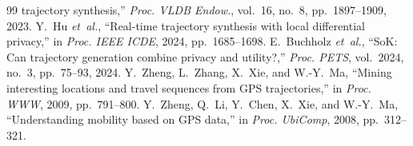 \documentclass[10pt,journal,compsoc]{IEEEtran}
\begin{document}
\begin{thebibliography}{99}
trajectory synthesis,'' \emph{Proc. VLDB Endow.}, vol.~16, no.~8, pp.~1897--1909,
2023.
 Y.~Hu \emph{et~al.}, ``Real-time trajectory synthesis with local
differential privacy,'' in \emph{Proc. IEEE ICDE}, 2024, pp.~1685--1698.
 E.~Buchholz \emph{et~al.}, ``SoK: Can trajectory generation
combine privacy and utility?,'' \emph{Proc. PETS}, vol.~2024, no.~3, pp.~75--93,
2024.
 Y.~Zheng, L.~Zhang, X.~Xie, and W.-Y.~Ma, ``Mining interesting
locations and travel sequences from GPS trajectories,'' in \emph{Proc. WWW}, 2009,
pp.~791--800.
 Y.~Zheng, Q.~Li, Y.~Chen, X.~Xie, and W.-Y.~Ma, ``Understanding
mobility based on GPS data,'' in \emph{Proc. UbiComp}, 2008, pp.~312--321.
\end{thebibliography}
\end{document}
